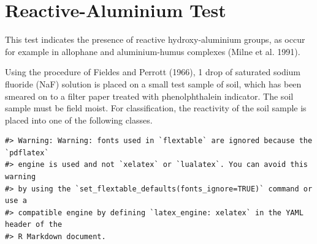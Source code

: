 \documentclass[
  letterpaper,
  DIV=11,
  numbers=noendperiod]{scrreprt}
\begin{document}
\hypertarget{sec-diag-naf}{%
\section{Reactive-Aluminium Test}\label{sec-diag-naf}}

This test indicates the presence of reactive hydroxy-aluminium groups,
as occur for example in allophane and aluminium-humus complexes (Milne
et al. 1991).

Using the procedure of Fieldes and Perrott (1966), 1 drop of saturated
sodium fluoride (NaF) solution is placed on a small test sample of soil,
which has been smeared on to a filter paper treated with phenolphthalein
indicator. The soil sample must be field moist. For classification, the
reactivity of the soil sample is placed into one of the following
classes.

\begin{verbatim}
#> Warning: Warning: fonts used in `flextable` are ignored because the `pdflatex`
#> engine is used and not `xelatex` or `lualatex`. You can avoid this warning
#> by using the `set_flextable_defaults(fonts_ignore=TRUE)` command or use a
#> compatible engine by defining `latex_engine: xelatex` in the YAML header of the
#> R Markdown document.
\end{verbatim}

\providecommand{\docline}[3]{\noalign{\global\setlength{\arrayrulewidth}{#1}}\arrayrulecolor[HTML]{#2}\cline{#3}}

\setlength{\tabcolsep}{2pt}

\renewcommand*{\arraystretch}{1.5}
\end{document}
